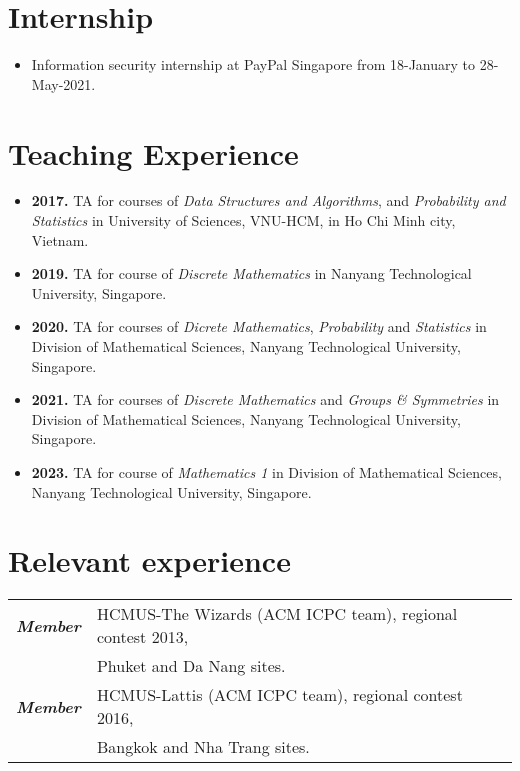 \documentclass[a4paper, 11pt]{article}
\begin{document}
	\section{Internship}
	\begin{itemize}
		\item Information security internship at PayPal Singapore from 18-January to 28-May-2021.
	\end{itemize}
	
	\section{Teaching Experience}
	\begin{itemize}
		\item \textbf{2017.} TA for courses of \textit{Data Structures and Algorithms}, and \textit{Probability and Statistics} in University of Sciences, VNU-HCM, in Ho Chi Minh city, Vietnam.
		\item \textbf{2019.} TA for course of \textit{Discrete Mathematics} in Nanyang Technological University, Singapore.
		\item \textbf{2020.} TA for courses of \textit{Dicrete Mathematics}, \textit{Probability} and \textit{Statistics} in Division of Mathematical Sciences, Nanyang Technological University, Singapore.
		\item \textbf{2021.} TA for courses of \textit{Discrete Mathematics} and \textit{Groups \& Symmetries} in Division of Mathematical Sciences, Nanyang Technological University, Singapore.
		\item \textbf{2023.} TA for course of \textit{Mathematics 1} in Division of Mathematical Sciences, Nanyang Technological University, Singapore.
	\end{itemize}
	
	\section{Relevant experience}
	\begin{tabular}{rl}
		{\sl \textbf{Member}} & HCMUS-The Wizards (ACM ICPC team), regional contest 2013,\\
		& Phuket and Da Nang sites.\\
		{\sl \textbf{Member}} & HCMUS-Lattis (ACM ICPC team), regional contest 2016,\\
		& Bangkok and Nha Trang sites. 
	\end{tabular}
	
	
	
\end{document}
